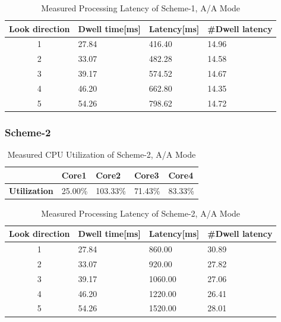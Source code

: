 \begin{table}[h!]
	\centering
	\begin{tabular}{|c|l|l|l|} 
	 \hline
	 \textbf{Look direction} & \textbf{Dwell time[ms]} & \textbf{Latency[ms]} & \textbf{\#Dwell latency} \\
	 \hline
	 1 & 27.84 & 416.40 & 14.96 \\ \hline
	 2 & 33.07 & 482.28 & 14.58 \\ \hline
	 3 & 39.17 & 574.52 & 14.67 \\ \hline
	 4 & 46.20 & 662.80 & 14.35 \\ \hline
	 5 & 54.26 & 798.62 & 14.72 \\ \hline
	\end{tabular}
	\caption{Measured Processing Latency of Scheme-1, A/A Mode}
	\label{tbl:mm:scheme1_true_latency}
\end{table}
\FloatBarrier

\subsubsection{Scheme-2}
\begin{table}[h!]
	\centering
	\begin{tabular}{|l|l|l|l|l|} 
	 \hline
	& \textbf{Core1} & \textbf{Core2} & \textbf{Core3} & \textbf{Core4} \\ \hline
	\textbf{Utilization} & 25.00\% & {\color{red} 103.33\%} & 71.43\% & 83.33\% \\ \hline
	\end{tabular}
	\caption{Measured CPU Utilization of Scheme-2, A/A Mode}
	\label{tbl:mm:scheme2_true_util}
\end{table}

\begin{table}[h!]
	\centering
	\begin{tabular}{|c|l|l|l|} 
	 \hline
	 \textbf{Look direction} & \textbf{Dwell time[ms]} & \textbf{Latency[ms]} & \textbf{\#Dwell latency} \\
	 \hline
	 1 & 27.84 & 860.00 & 30.89 \\ \hline
	 2 & 33.07 & 920.00 & 27.82 \\ \hline
	 3 & 39.17 & 1060.00 & 27.06 \\ \hline
	 4 & 46.20 & 1220.00 & 26.41 \\ \hline
	 5 & 54.26 & 1520.00 & 28.01 \\ \hline
	\end{tabular}
	\caption{Measured Processing Latency of Scheme-2, A/A Mode}
	\label{tbl:mm:scheme2_true_latency}
\end{table}
\FloatBarrier

